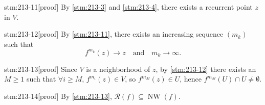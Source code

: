 \documentclass{article}
\begin{document}
\begin{stm}{stm:213-11}[proof]
By \ref{stm:213-3} and \ref{stm:213-4}, there exists a recurrent point $z$ in $V$.
\end{stm}

\begin{stm}{stm:213-12}[proof]
By \ref{stm:213-11}, there exists an increasing sequence $(m_k)$ such that 
\[
f^{m_k}(z) \to z \quad \text{and} \quad m_k \to \infty.
\]
\end{stm}

\begin{stm}{stm:213-13}[proof]
Since $V$ is a neighborhood of $z$, by \ref{stm:213-12} there exists an $M \geq 1$ such that $\forall i \geq M$, $f^{m_i}(z) \in V$, so $f^{m_M}(z) \in U$, hence $f^{m_M}(U) \cap U \neq \emptyset$.
\end{stm}

\begin{stm}{stm:213-14}[proof]
By \ref{stm:213-13}, $\mathcal{R}(f) \subseteq \operatorname{NW}(f)$.
\end{stm}
\end{document}
